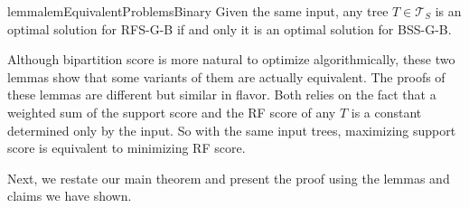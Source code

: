 \documentclass[twocolumn]{bmcart}%
\newcommand{\bss}{\textsc{BSS}\xspace}
\newcommand{\rfs}{\textsc{RFS}\xspace}
\newcommand{\B}{\textsc{B}\xspace}
\renewcommand{\G}{\textsc{G}\xspace}
\theoremstyle{mystyle}
\theoremstyle{proofstyle}
\begin{document}
\begin{restatable}{lemma}{lemEquivalentProblemsBinary} \label{lem: equivalence_RF_support_binary}
Given the same input, any tree $T \in \mathcal{T}_S$ is an optimal solution for \rfs-\G-\B if and only it is an optimal solution for \bss-\G-\B.
\end{restatable}
Although bipartition score is more natural to optimize algorithmically, these two lemmas show that some variants of them are actually equivalent. The proofs of these lemmas are different but similar in flavor. Both relies on the fact that a weighted sum of the support score and the RF score of any $T$ is a constant determined only by the input. So with the same input trees, maximizing support score is equivalent to minimizing RF score. 

Next, we restate our main theorem and present the proof using the lemmas and claims we have shown. 
\thmCorrectAlg*
\end{document}
